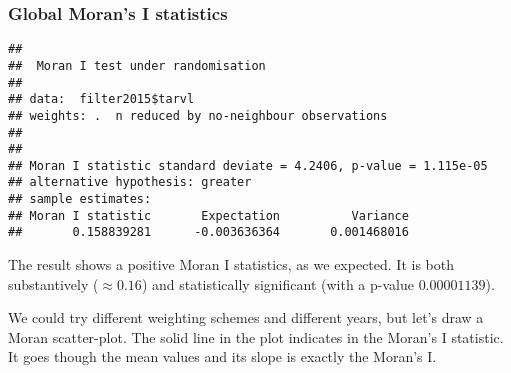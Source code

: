 \documentclass[
]{article}
\newenvironment{Shaded}{\begin{snugshade}}{\end{snugshade}}
\newcommand{\AttributeTok}[1]{\textcolor[rgb]{0.77,0.63,0.00}{#1}}
\newcommand{\ConstantTok}[1]{\textcolor[rgb]{0.00,0.00,0.00}{#1}}
\newcommand{\DecValTok}[1]{\textcolor[rgb]{0.00,0.00,0.81}{#1}}
\newcommand{\DocumentationTok}[1]{\textcolor[rgb]{0.56,0.35,0.01}{\textbf{\textit{#1}}}}
\newcommand{\FunctionTok}[1]{\textcolor[rgb]{0.00,0.00,0.00}{#1}}
\newcommand{\NormalTok}[1]{#1}
\newcommand{\SpecialCharTok}[1]{\textcolor[rgb]{0.00,0.00,0.00}{#1}}
\newcommand{\StringTok}[1]{\textcolor[rgb]{0.31,0.60,0.02}{#1}}
\begin{document}
\hypertarget{global-morans-i-statistics}{%
\subsubsection{Global Moran's I
statistics}\label{global-morans-i-statistics}}

\begin{Shaded}
\end{Shaded}

\begin{verbatim}
## 
##  Moran I test under randomisation
## 
## data:  filter2015$tarvl  
## weights: .  n reduced by no-neighbour observations
##   
## 
## Moran I statistic standard deviate = 4.2406, p-value = 1.115e-05
## alternative hypothesis: greater
## sample estimates:
## Moran I statistic       Expectation          Variance 
##       0.158839281      -0.003636364       0.001468016
\end{verbatim}

The result shows a positive Moran I statistics, as we expected. It is
both substantively (\(\approx 0.16\)) and statistically significant
(with a p-value \(0.00001139\)).

We could try different weighting schemes and different years, but let's
draw a Moran scatter-plot. The solid line in the plot indicates in the
Moran's I statistic. It goes though the mean values and its slope is
exactly the Moran's I.

\begin{Shaded}
\end{Shaded}
\end{document}

